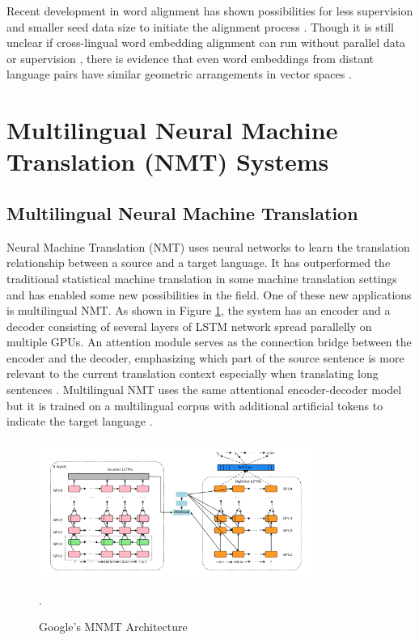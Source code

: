 \documentclass[thesis,fonts=libertine]{cluu}
\begin{document}
Recent development in word alignment has shown possibilities for less supervision and smaller seed data size to initiate the alignment process \parencite{Ruder:2019aa}. Though it is still unclear if cross-lingual word embedding alignment can run without parallel data or supervision \parencite{Dyer1365879}, there is evidence that even word embeddings from distant language pairs have similar geometric arrangements in vector spaces \parencite{Mikolov:2013ac}.

\section{Multilingual Neural Machine Translation (NMT) Systems}

\subsection{Multilingual Neural Machine Translation}

Neural Machine Translation (NMT) uses neural networks to learn the translation relationship between a source and a target language. It has outperformed the traditional statistical machine translation in some machine translation settings and has enabled some new possibilities in the field. One of these new applications is multilingual NMT. As shown in Figure \ref{fig:google_mnmt}, the system has an encoder and a decoder consisting of several layers of LSTM network spread parallelly on multiple GPUs. An attention module serves as the connection bridge between the encoder and the decoder, emphasizing which part of the source sentence is more relevant to the current translation context especially when translating long sentences \parencite{Wu:2016aa}. Multilingual NMT uses the same attentional encoder-decoder model but it is trained on a multilingual corpus with additional artificial tokens to indicate the target language \parencite{Johnson:2016aa}.

\begin{figure}
  \centering
  \includegraphics[width=0.8\textwidth]{google_mnmt_architecture.png}
  \caption{Google's MNMT Architecture \parencite{Johnson:2016aa,Wu:2016aa}}.
  \label{fig:google_mnmt}
\end{figure}
\end{document}
